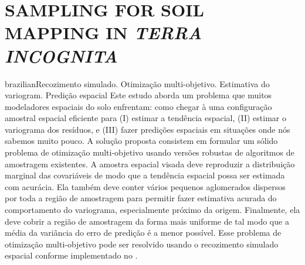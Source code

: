 \artigotrue
\chapter{SAMPLING FOR SOIL MAPPING IN \emph{TERRA INCOGNITA}}
\label{chap:chap09}

\def\ptkeys{Recozimento simulado. Otimização multi-objetivo. Estimativa do variogram. Predição espacial}
\begin{chapterabstract}{brazilian}{\ptkeys}
Este estudo aborda um problema que muitos modeladores espaciais do solo enfrentam: como chegar à uma 
configuração amostral espacial eficiente para (I) estimar a tendência espacial, (II) estimar o variograma dos 
resíduos, e (III) fazer predições espaciais em situações onde nós sabemos muito pouco. A solução proposta 
consistem em formular um sólido problema de otimização multi-objetivo usando versões robustas de algoritmos de 
amostragem existentes. A amostra espacial visada deve reproduzir a distribuição marginal das covariáveis de 
modo que a tendência espacial possa ser estimada com acurácia. Ela também deve conter vários pequenos 
aglomerados dispersos por toda a região de amostragem para permitir fazer estimativa acurada do comportamento 
do variograma, especialmente próximo da origem. Finalmente, ela deve cobrir a região de amostragem da forma 
mais uniforme de tal modo que a média da variância do erro de predição é a menor possível. Esse problema de 
otimização multi-objetivo pode ser resolvido usando o recozimento simulado espacial conforme implementado no 
.
\end{chapterabstract}

\def\enkeys{Simulated annealing. Multi-objective optimization. Variogram estimation. Spatial prediction}
  
